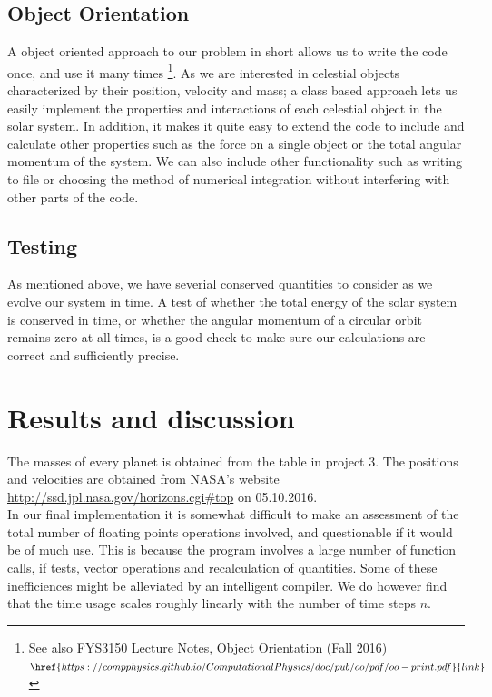 \documentclass[%
 reprint,
 nobalance,
 amsmath,amssymb,
 aps,
]{revtex4-1}
\begin{document}
\subsection{Object Orientation}
A object oriented approach to our problem in short allows us to write the code once, and use it many times \footnote{See also FYS3150 Lecture Notes, Object Orientation (Fall 2016) $\href{https://compphysics.github.io/ComputationalPhysics/doc/pub/oo/pdf/oo-print.pdf}{link}$}.
As we are interested in celestial objects characterized by their position, velocity and mass; a class based approach lets us easily implement the properties and interactions of each celestial object in the solar system. In addition, it makes it quite easy to extend the code to include and calculate other properties such as the force on a single object or the total angular momentum of the system. We can also include other functionality such as writing to file or choosing the method of numerical integration without interfering with other parts of the code.


\subsection{\label{sec:Uni}Testing}
As mentioned above, we have severial conserved quantities to consider as we evolve our system in time. A test of whether the total energy of the solar system is conserved in time, or whether the angular momentum of a circular orbit remains zero at all times, is a good check to make sure our calculations are correct and sufficiently precise.



\section{Results and discussion}
The masses of every planet is obtained from the table in project 3. The positions and velocities are obtained from NASA's website \url{http://ssd.jpl.nasa.gov/horizons.cgi#top} on 05.10.2016. \\

In our final implementation it is somewhat difficult to make an assessment of the total number of floating points operations involved, and questionable if it would be of much use. This is because the program involves a large number of function calls, if tests, vector operations and recalculation of quantities. Some of these inefficiences might be alleviated by an intelligent compiler. We do however find that the time usage scales roughly linearly with the number of time steps $n$.
\end{document}
